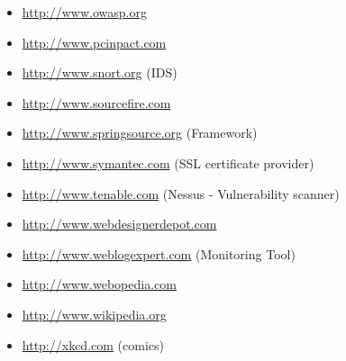 \begin{itemize}
\item \url{http://www.owasp.org}
\item \url{http://www.pcinpact.com}
\item \url{http://www.snort.org} (IDS)
\item \url{http://www.sourcefire.com}
\item \url{http://www.springsource.org} (Framework)
\item \url{http://www.symantec.com} (SSL certificate provider)
\item \url{http://www.tenable.com} (Nessus - Vulnerability scanner)
\item \url{http://www.webdesignerdepot.com}
\item \url{http://www.weblogexpert.com} (Monitoring Tool)
\item \url{http://www.webopedia.com}
\item \url{http://www.wikipedia.org}
\item \url{http://xkcd.com} (comics)
\end{itemize}
